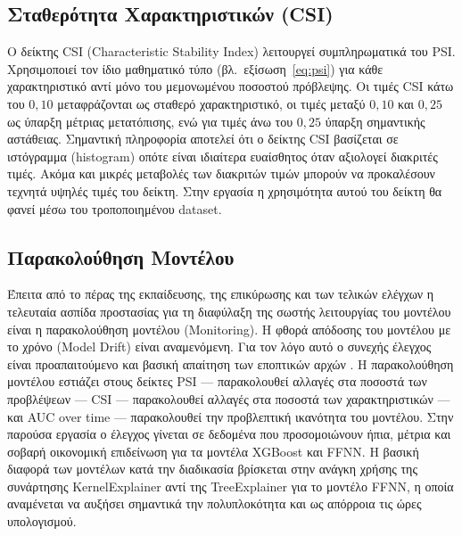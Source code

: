 \subsection{Σταθερότητα Χαρακτηριστικών (CSI)}
\label{sec:csi}

Ο δείκτης CSI (Characteristic Stability Index) λειτουργεί συμπληρωματικά
του PSI. Χρησιμοποιεί τον ίδιο μαθηματικό τύπο (βλ.\ εξίσωση~\ref{eq:psi})
για κάθε χαρακτηριστικό αντί μόνο του μεμονωμένου ποσοστού πρόβλεψης.
Οι τιμές CSI κάτω του $0{,}10$ μεταφράζονται ως σταθερό χαρακτηριστικό,
οι τιμές μεταξύ $0{,}10$ και $0{,}25$ ως ύπαρξη μέτριας μετατόπισης,
ενώ για τιμές άνω του $0{,}25$ ύπαρξη σημαντικής αστάθειας. Σημαντική
πληροφορία αποτελεί ότι ο δείκτης CSI βασίζεται σε ιστόγραμμα (histogram)
οπότε είναι ιδιαίτερα ευαίσθητος όταν αξιολογεί διακριτές τιμές. Ακόμα
και μικρές μεταβολές των διακριτών τιμών μπορούν να προκαλέσουν τεχνητά
υψηλές τιμές του δείκτη. Στην εργασία η χρησιμότητα αυτού του δείκτη
θα φανεί μέσω του τροποποιημένου dataset.


\subsection{Παρακολούθηση Μοντέλου}
\label{sec:monitoring_methodology}

Έπειτα από το πέρας της εκπαίδευσης, της επικύρωσης και των τελικών
ελέγχων η τελευταία ασπίδα προστασίας για τη διαφύλαξη της σωστής
λειτουργίας του μοντέλου είναι η παρακολούθηση μοντέλου (Monitoring).
Η φθορά απόδοσης του μοντέλου με το χρόνο (Model Drift) είναι
αναμενόμενη. Για τον λόγο αυτό ο συνεχής έλεγχος είναι προαπαιτούμενο
και βασική απαίτηση των εποπτικών αρχών \citep{eba2023}. Η παρακολούθηση μοντέλου
εστιάζει στους δείκτες PSI --- παρακολουθεί αλλαγές στα ποσοστά των
προβλέψεων --- CSI --- παρακολουθεί αλλαγές στα ποσοστά των
χαρακτηριστικών --- και AUC over time --- παρακολουθεί την προβλεπτική
ικανότητα του μοντέλου. Στην παρούσα εργασία ο έλεγχος γίνεται σε
δεδομένα που προσομοιώνουν ήπια, μέτρια και σοβαρή οικονομική
επιδείνωση για τα μοντέλα XGBoost και FFNN. Η βασική διαφορά των
μοντέλων κατά την διαδικασία βρίσκεται στην ανάγκη χρήσης της
συνάρτησης KernelExplainer \citep{lundberg2017shap} 
αντί της TreeExplainer \citep{lundberg2020local} για το μοντέλο FFNN,
η οποία αναμένεται να αυξήσει σημαντικά την πολυπλοκότητα και ως
απόρροια τις ώρες υπολογισμού.